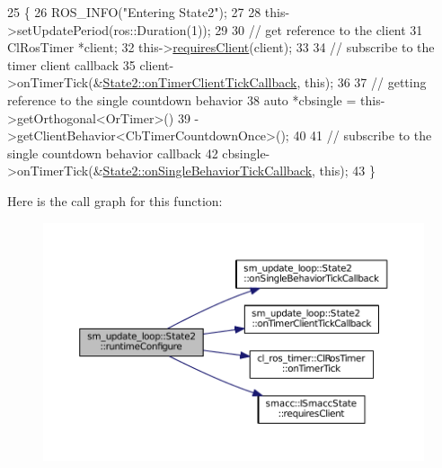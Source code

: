 \begin{DoxyCode}
25     \{
26         ROS\_INFO(\textcolor{stringliteral}{"Entering State2"});
27 
28         this->setUpdatePeriod(ros::Duration(1));
29 
30         \textcolor{comment}{// get reference to the client}
31         ClRosTimer *client;
32         this->\hyperlink{classsmacc_1_1ISmaccState_a7f95c9f0a6ea2d6f18d1aec0519de4ac}{requiresClient}(client);
33 
34         \textcolor{comment}{// subscribe to the timer client callback}
35         client->onTimerTick(&\hyperlink{structsm__update__loop_1_1State2_a6de20c89117e60923ba556bedeb0d231}{State2::onTimerClientTickCallback}, \textcolor{keyword}{this});
36 
37         \textcolor{comment}{// getting reference to the single countdown behavior}
38         \textcolor{keyword}{auto} *cbsingle = this->getOrthogonal<OrTimer>()
39                              ->getClientBehavior<CbTimerCountdownOnce>();
40 
41         \textcolor{comment}{// subscribe to the single countdown behavior callback}
42         cbsingle->onTimerTick(&\hyperlink{structsm__update__loop_1_1State2_ab3e5ab2f3afd27d1550dda7f4e09b6fb}{State2::onSingleBehaviorTickCallback}, \textcolor{keyword}{
      this});
43     \}
\end{DoxyCode}


Here is the call graph for this function\+:
\nopagebreak
\begin{figure}[H]
\begin{center}
\leavevmode
\includegraphics[width=350pt]{structsm__update__loop_1_1State2_ad817c7ed319628e2794a05bb6aa10921_cgraph}
\end{center}
\end{figure}



